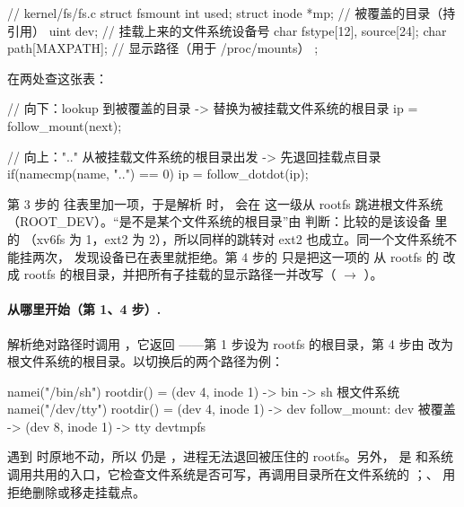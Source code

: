 \begin{ccode}
// kernel/fs/fs.c
struct fsmount {
  int          used;
  struct inode *mp;           // 被覆盖的目录（持引用）
  uint         dev;           // 挂载上来的文件系统设备号
  char         fstype[12], source[24];
  char         path[MAXPATH]; // 显示路径（用于 /proc/mounts）
};
\end{ccode}

 在两处查这张表：

\begin{ccode}
// 向下：lookup 到被覆盖的目录 -> 替换为被挂载文件系统的根目录
ip = follow_mount(next);

// 向上：".." 从被挂载文件系统的根目录出发 -> 先退回挂载点目录
if(namecmp(name, "..") == 0)
    ip = follow_dotdot(ip);
\end{ccode}

第 3 步的  往表里加一项，于是解析  时， 会在  这一级从 rootfs 跳进根文件系统（ROOT\_DEV）。“是不是某个文件系统的根目录”由  判断：比较的是该设备  里的 （xv6fs 为 1，ext2 为 2），所以同样的跳转对 ext2 也成立。同一个文件系统不能挂两次， 发现设备已在表里就拒绝。第 4 步的  只是把这一项的  从 rootfs 的  改成 rootfs 的根目录，并把所有子挂载的显示路径一并改写（ $\to$ ）。

\paragraph{\code{/} 从哪里开始（第 1、4 步）.}  解析绝对路径时调用 ，它返回 ——第 1 步设为 rootfs 的根目录，第 4 步由  改为根文件系统的根目录。以切换后的两个路径为例：

\begin{txtcode}
namei("/bin/sh")    rootdir() = (dev 4, inode 1)  -> bin -> sh        根文件系统
namei("/dev/tty")   rootdir() = (dev 4, inode 1)  -> dev
                    follow_mount: dev 被覆盖 -> (dev 8, inode 1) -> tty  devtmpfs
\end{txtcode}

 遇到  时原地不动，所以  仍是 \code{/}，进程无法退回被压住的 rootfs。另外， 是  和系统调用共用的入口，它检查文件系统是否可写，再调用目录所在文件系统的 ；、 用  拒绝删除或移走挂载点。


